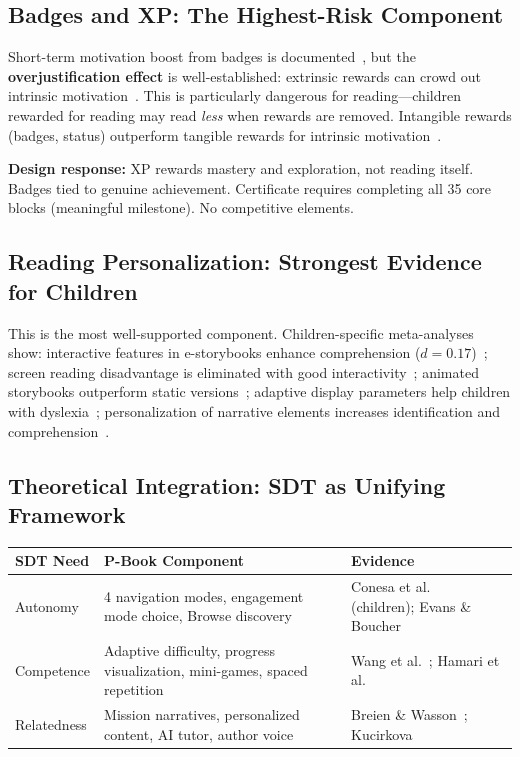 \documentclass[11pt,a4paper]{article}
\begin{document}
\subsection{Badges and XP: The Highest-Risk Component}

Short-term motivation boost from badges is documented~\cite{leitao2021,kim2021}, but the \textbf{overjustification effect} is well-established: extrinsic rewards can crowd out intrinsic motivation~\cite{gneezy2011}. This is particularly dangerous for reading---children rewarded for reading may read \emph{less} when rewards are removed. Intangible rewards (badges, status) outperform tangible rewards for intrinsic motivation~\cite{xiao2023}.

\textbf{Design response:} XP rewards mastery and exploration, not reading itself. Badges tied to genuine achievement. Certificate requires completing all 35 core blocks (meaningful milestone). No competitive elements.

\subsection{Reading Personalization: Strongest Evidence for Children}

This is the most well-supported component. Children-specific meta-analyses show: interactive features in e-storybooks enhance comprehension ($d{=}0.17$)~\cite{takacs2015}; screen reading disadvantage is eliminated with good interactivity~\cite{furenes2021}; animated storybooks outperform static versions~\cite{takacs2016}; adaptive display parameters help children with dyslexia~\cite{schneps2013}; personalization of narrative elements increases identification and comprehension~\cite{kucirkova2019}.

\subsection{Theoretical Integration: SDT as Unifying Framework}

\begin{center}
\small
\begin{tabular}{@{}p{2cm}p{4.5cm}p{5cm}@{}}
\toprule
\textbf{SDT Need} & \textbf{P-Book Component} & \textbf{Evidence} \\
\midrule
Autonomy & 4 navigation modes, engagement mode choice, Browse discovery & Conesa et al.~\cite{conesa2022} (children); Evans \& Boucher~\cite{evans2015} \\
Competence & Adaptive difficulty, progress visualization, mini-games, spaced repetition & Wang et al.~\cite{wang2024}; Hamari et al.~\cite{hamari2015} \\
Relatedness & Mission narratives, personalized content, AI tutor, author voice & Breien \& Wasson~\cite{breien2020}; Kucirkova~\cite{kucirkova2019} \\
\bottomrule
\end{tabular}
\end{center}
\end{document}
